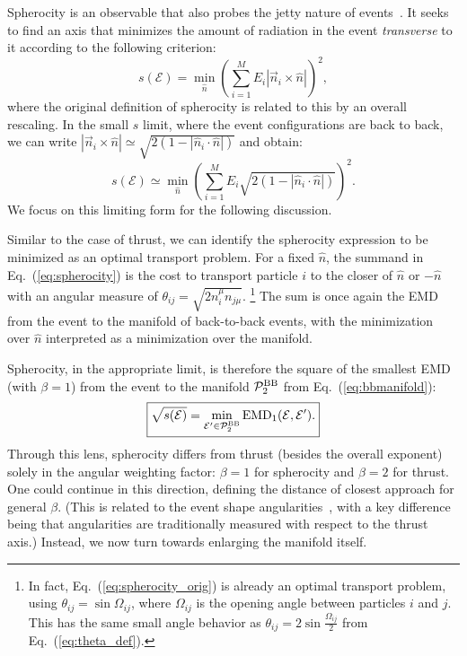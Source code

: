 \documentclass[letterpaper,11pt]{article}
\newcommand{\E}{\mathcal{E}}
\DeclareRobustCommand{\Eq}[1]{Eq.~(\ref{#1})}
\begin{document}
Spherocity is an observable that also probes the jetty nature of events~\cite{Georgi:1977sf}.
%
It seeks to find an axis that minimizes the amount of radiation in the event \emph{transverse} to it according to the following criterion:
%
\begin{equation}
\label{eq:spherocity_orig}
s(\E) = \min_{\hat n} \left(\sum_{i=1}^ME_i|\vec n_i\times\hat n| \right)^2,
\end{equation}
%
where the original definition of spherocity is related to this by an overall rescaling.
%
In the small $s$ limit, where the event configurations are back to back, we can write $|\vec n_i\times\hat n|\simeq \sqrt{2(1- |\hat n_i\cdot\hat n|)}$ and obtain:
%
\begin{equation}
\label{eq:spherocity}
s(\mathcal E)  \simeq \min_{\hat n} \left( \sum_{i=1}^M E_i \sqrt{2(1 - |\hat n_i \cdot \hat n|)} \right)^2.
\end{equation}
%
We focus on this limiting form for the following discussion.


Similar to the case of thrust, we can identify the spherocity expression to be minimized as an optimal transport problem.
%
For a fixed $\hat n$, the summand in \Eq{eq:spherocity} is the cost to transport particle $i$ to the closer of $\hat n$ or $-\hat n$ with an angular measure of $\theta_{ij}=\sqrt{2n^\mu_i n_{j\mu}}$.%
%
\footnote{In fact, \Eq{eq:spherocity_orig} is already an optimal transport problem, using $\theta_{ij} = \sin \Omega_{ij}$, where $\Omega_{ij}$ is the opening angle between particles $i$ and $j$.  This has the same small angle behavior as $\theta_{ij} = 2 \sin \frac{\Omega_{ij}}{2}$ from \Eq{eq:theta_def}.}
%
The sum is once again the EMD from the event to the manifold of back-to-back events, with the minimization over $\hat n$ interpreted as a minimization over the manifold.


Spherocity, in the appropriate limit, is therefore the square of the smallest EMD (with $\beta=1$) from the event to the manifold $\mathcal P^{\rm BB}_2$ from \Eq{eq:bbmanifold}:
%
\begin{equation}\label{eq:spherocityasEMD}
\begin{boxed}{
\sqrt{s(\mathcal E)} = \min_{\mathcal E' \in \mathcal P^{\rm BB}_2} \text{EMD}_1(\mathcal E, \mathcal E').
}\end{boxed}
\end{equation}
%
Through this lens, spherocity differs from thrust (besides the overall exponent) solely in the angular weighting factor:  $\beta=1$ for spherocity and $\beta=2$ for thrust.
%
One could continue in this direction, defining the distance of closest approach for general $\beta$.
%
(This is related to the event shape angularities~\cite{Berger:2003iw}, with a key difference being that angularities are traditionally measured with respect to the thrust axis.)
%
Instead, we now turn towards enlarging the manifold itself.
\end{document}
